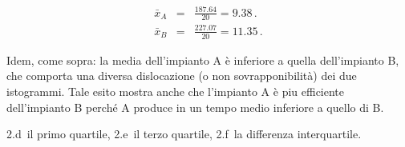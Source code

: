 \documentclass[
  11pt,
]{book}
\theoremstyle{mytheoremstyle}
\theoremstyle{mydefstyle}
\newenvironment{sol}
  {
  \begin{tcolorbox}[enhanced,breakable,arc=0.1mm,boxrule=1pt,colback=white,colframe=iblue,
  title=\bf \fontfamily{lmss}\selectfont \hspace{.5 cm} Soluzione,drop fuzzy shadow]

}{
\end{tcolorbox}
  }
\begin{document}
\begin{sol}
\begin{eqnarray*}
\bar{x}_{A} &=& \frac{187.64} {20} = 9.38 \,. \\
\bar{x}_{B} &=& \frac{227.07} {20} = 11.35 \,.
\end{eqnarray*}

Idem, come sopra: la media dell'impianto A è inferiore a quella
dell'impianto B, che comporta una diversa dislocazione (o non
sovrapponibilità) dei due istogrammi.
Tale esito mostra anche che l'impianto A è pi\textquotesingle u efficiente
dell'impianto B perché A produce in un tempo medio inferiore
a quello di B.

\end{sol}

2.d \(\,\)il primo quartile,
2.e \(\,\)il terzo quartile,
2.f \(\,\)la differenza interquartile.
\end{document}
